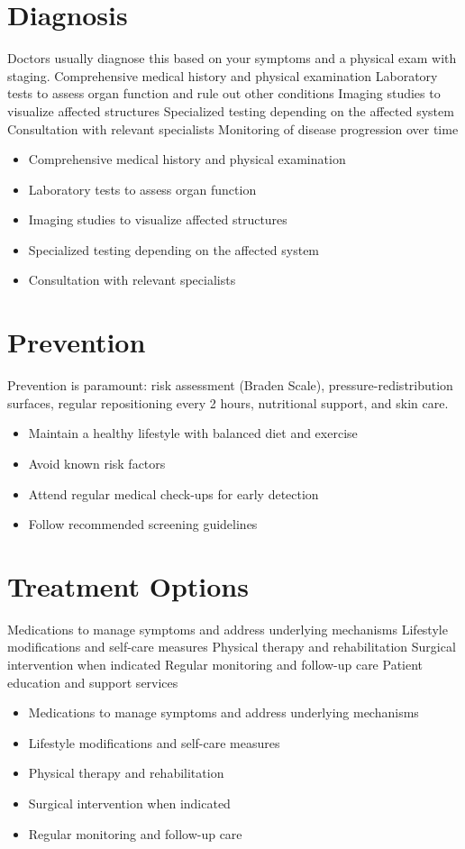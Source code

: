 \section{Diagnosis}
Doctors usually diagnose this based on your symptoms and a physical exam with staging. Comprehensive medical history and physical examination Laboratory tests to assess organ function and rule out other conditions Imaging studies to visualize affected structures Specialized testing depending on the affected system Consultation with relevant specialists Monitoring of disease progression over time

\begin{itemize}[noitemsep]
  \item Comprehensive medical history and physical examination
  \item Laboratory tests to assess organ function
  \item Imaging studies to visualize affected structures
  \item Specialized testing depending on the affected system
  \item Consultation with relevant specialists
\end{itemize}
\section{Prevention}
Prevention is paramount: risk assessment (Braden Scale), pressure-redistribution surfaces, regular repositioning every 2 hours, nutritional support, and skin care.

\begin{itemize}[noitemsep]
  \item Maintain a healthy lifestyle with balanced diet and exercise
  \item Avoid known risk factors
  \item Attend regular medical check-ups for early detection
  \item Follow recommended screening guidelines
\end{itemize}
\section{Treatment Options}
Medications to manage symptoms and address underlying mechanisms Lifestyle modifications and self-care measures Physical therapy and rehabilitation Surgical intervention when indicated Regular monitoring and follow-up care Patient education and support services

\begin{itemize}[noitemsep]
  \item Medications to manage symptoms and address underlying mechanisms
  \item Lifestyle modifications and self-care measures
  \item Physical therapy and rehabilitation
  \item Surgical intervention when indicated
  \item Regular monitoring and follow-up care
\end{itemize}
